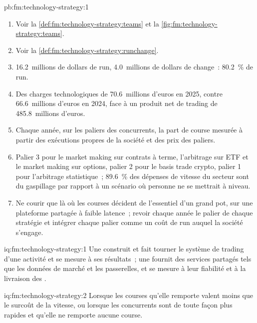 \begin{solution}{pb:fm:technology-strategy:1}
\begin{enumerate}
\item Voir la \cref{def:fm:technology-strategy:teams} et la \cref{fig:fm:technology-strategy:teams}.
\item Voir la \cref{def:fm:technology-strategy:runchange}.
\item 16.2~millions de dollars de run, 4.0~millions de dollars de change~: 80.2~\% de run.
\item Des charges technologiques de 70.6~millions d'euros en 2025, contre 66.6~millions d'euros en 2024, face à un produit net de trading de 485.8~millions d'euros.
\item Chaque année, sur les paliers des concurrents, la part de course mesurée à partir des exécutions propres de la société et des prix des paliers.
\item Palier 3 pour le market making sur contrats à terme, l'arbitrage sur ETF et le market making sur options, palier 2 pour le basis trade crypto, palier 1 pour
l'arbitrage statistique~; 89.6~\% des dépenses de vitesse du secteur sont du gaspillage par rapport à un scénario où personne ne se mettrait à niveau.
\item Ne courir que là où les courses décident de l'essentiel d'un grand pot, sur une plateforme partagée à faible latence~; revoir chaque année le palier de chaque stratégie et
intégrer chaque palier comme un coût de run auquel la société s'engage.
\end{enumerate}
\end{solution}

\begin{solution}{iq:fm:technology-strategy:1}
Une  construit et fait tourner le système de trading d'une activité et se mesure à ses résultats~; une  fournit des services partagés tels que
les données de marché et les passerelles, et se mesure à leur fiabilité et à la livraison des .
\end{solution}

\begin{solution}{iq:fm:technology-strategy:2}
Lorsque les courses qu'elle remporte valent moins que le surcoût de la vitesse, ou lorsque les concurrents sont de toute façon plus rapides et qu'elle ne remporte aucune course.
\end{solution}

